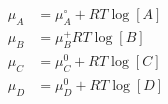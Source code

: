 \begin{eqnarray}\label{eqn:chemical-potential}
\mu_A & = \mu_A^\circ + RT\log [A] \\
\mu_B & = \mu_B^ + RT\log [B] \\
\mu_C & = \mu_C^0 + RT\log [C] \\
\mu_D & = \mu_D^0 + RT\log [D] \\
\end{eqnarray}